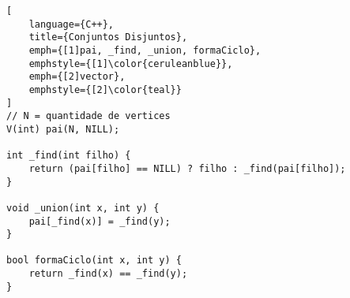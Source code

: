 \begin{lstlisting}[
    language={C++}, 
    title={Conjuntos Disjuntos}, 
    emph={[1]pai, _find, _union, formaCiclo},
    emphstyle={[1]\color{ceruleanblue}},
    emph={[2]vector},
    emphstyle={[2]\color{teal}}
]
// N = quantidade de vertices
V(int) pai(N, NILL);

int _find(int filho) { 
    return (pai[filho] == NILL) ? filho : _find(pai[filho]); 
}
 
void _union(int x, int y) { 
    pai[_find(x)] = _find(y); 
}

bool formaCiclo(int x, int y) { 
    return _find(x) == _find(y);
}
\end{lstlisting}